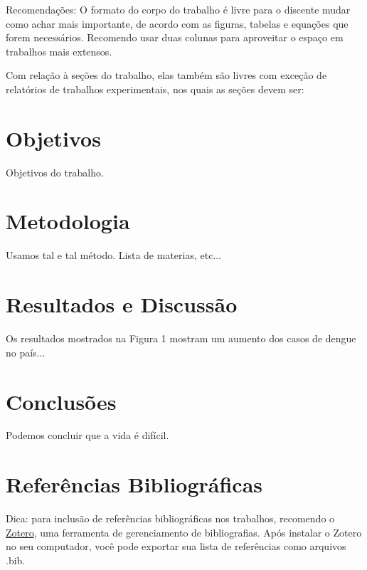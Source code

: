 \documentclass[a4paper,12pt]{article}
\begin{document}
    \begin{multicols}{2}
        Recomendações: O formato do corpo do trabalho é livre para o discente
        mudar como achar mais importante, de acordo com as figuras, tabelas e
        equações que forem necessários. Recomendo usar duas colunas para
        aproveitar o espaço em trabalhos mais extensos.

        Com relação à seções do trabalho, elas também são livres com exceção de
        relatórios de trabalhos experimentais, nos quais as seções devem ser:

        \section{Objetivos}

            Objetivos do trabalho.

        \section{Metodologia}

            Usamos tal e tal método. Lista de materias, etc...

        \section{Resultados e Discussão}

            Os resultados mostrados na Figura 1 mostram um aumento dos casos de
            dengue no país...

        \section{Conclusões}

            Podemos concluir que a vida é difícil.

        \section{Referências Bibliográficas}

        Dica: para inclusão de referências bibliográficas nos trabalhos,
        recomendo o \href{zotero.org}{Zotero}, uma ferramenta de gerenciamento
        de bibliografias.  Após instalar o Zotero no seu computador, você pode
        exportar sua lista de referências como arquivos .bib.
    \end{multicols}
\end{document}
